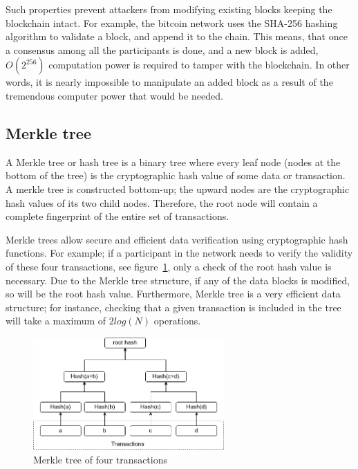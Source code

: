 \documentclass[11pt,a4paper]{report}
\begin{document}
Such properties prevent attackers from modifying existing blocks keeping the blockchain intact. For example, the bitcoin network uses the SHA-256 hashing algorithm to validate a block, and append it to the chain. This means, that once a consensus among all the participants is done, and a new block is added, $ O(2^{256}) $ computation power is required to tamper with the blockchain. In other words, it is nearly impossible to manipulate an added block as a result of the tremendous computer power that would be needed.

\subsection{Merkle tree}\label{sec:mt}
A Merkle tree\cite{article:merkle}\cite{book:merkle} or hash tree is a binary tree where every leaf node (nodes at the bottom of the tree) is the cryptographic hash value of some data or transaction. A merkle tree is constructed bottom-up; the upward nodes are the cryptographic hash values of its two child nodes. Therefore, the root node  will contain a complete fingerprint of the entire set of transactions. 

Merkle trees allow secure and efficient data verification using cryptographic hash functions. For example; if a participant in the network needs to verify the validity of these four transactions, see figure~\ref{fig:merkle}, only a check of the root hash value is necessary. Due to the Merkle tree structure, if any of the data blocks is modified, so will be the root hash value. Furthermore, Merkle tree is a very efficient data structure; for instance, checking that a given transaction is included in the tree will take a maximum of $2log (N)$ operations.
\begin{figure}[htp]
	\centering
	\includegraphics[width=0.65\textwidth]{./images/merkle}
	\caption{Merkle tree of four transactions}
	\label{fig:merkle}
\end{figure}
\end{document}
